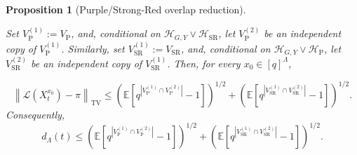\documentclass[letterpaper,11pt,reqno]{amsart}
\newtheorem{prop}[thm]{Proposition}
\theoremstyle{definition}
\newcommand{\Law}{\mathcal L}
\begin{document}
\begin{prop}[Purple/Strong-Red overlap reduction]\label{prop:IP-overlap}


Set \(V_{\mathrm{P}}^{(1)}:=V_{\mathrm{P}}\), and, conditional on
\(\mathcal H_{G,Y}\vee\mathcal H_{\mathrm{SR}}\), let
\(V_{\mathrm{P}}^{(2)}\) be an independent copy of
\(V_{\mathrm{P}}^{(1)}\). Similarly, set
\(V_{\mathrm{SR}}^{(1)}:=V_{\mathrm{SR}}\), and, conditional on
\(\mathcal H_{G,Y}\vee\mathcal H_{\mathrm{P}}\), let
\(V_{\mathrm{SR}}^{(2)}\) be an independent copy of
\(V_{\mathrm{SR}}^{(1)}\). Then, for every \(x_0\in[q]^\Lambda\),


\[
\left\|
\Law(X_t^{x_0})-\pi
\right\|_{\mathrm{TV}}
\le
\left(
\mathbb E\left[
q^{|V_{\mathrm{P}}^{(1)}\cap V_{\mathrm{P}}^{(2)}|}-1
\right]
\right)^{1/2}
+
\left(
\mathbb E\left[
q^{|V_{\mathrm{SR}}^{(1)}\cap V_{\mathrm{SR}}^{(2)}|}-1
\right]
\right)^{1/2}.
\]
Consequently,
\[
d_\Lambda(t)
\le
\left(
\mathbb E\left[
q^{|V_{\mathrm{P}}^{(1)}\cap V_{\mathrm{P}}^{(2)}|}-1
\right]
\right)^{1/2}
+
\left(
\mathbb E\left[
q^{|V_{\mathrm{SR}}^{(1)}\cap V_{\mathrm{SR}}^{(2)}|}-1
\right]
\right)^{1/2}.
\]
\end{prop}
\end{document}
